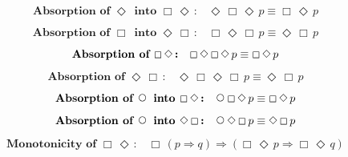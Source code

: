 \documentclass[12pt, fleqn, leqno]{article}
\newcommand{\impl}{\ensuremath{\Rightarrow}}        %
\newcommand{\Next}{\;\,\text{\raisebox{3.5pt}{\circle{6}}}}
\newcommand{\Event}{\Diamond\,}
\newcommand{\Always}{\Box\,}
\newcommand{\spacer}{\vspace{-30pt}}
\begin{document}
\spacer

\begin{equation}\label{E:absEvent}
\textbf{Absorption of $\Event$ into $\Always\Event$:}\quad \Event\Always\Event p \equiv \Always\Event p
\end{equation}

\spacer

\begin{equation}\label{E:absAlways}
\textbf{Absorption of $\Always$ into $\Event\Always$:}\quad \Always\Event\Always p \equiv \Event\Always p
\end{equation}

\spacer

\begin{equation}\label{E:absAlwaysEvent}
\textbf{Absorption of $ \Always\Event$:}\quad \Always \Event\Always\Event p \equiv \Always\Event p
\end{equation}

\spacer

\begin{equation}\label{E:absEventAlways}
\textbf{Absorption of $\Event \Always$:}\quad \Event \Always \Event\Always p \equiv \Event\Always p
\end{equation}

\spacer

\begin{equation}\label{E:absNextAlwaysEvent}
\textbf{Absorption of $\Next$ into $\Always\Event$:}\quad \Next\Always\Event p \equiv \Always\Event p
\end{equation}

\spacer

\begin{equation}\label{E:absNextEventAlways}
\textbf{Absorption of $\Next$ into $\Event\Always$:}\quad \Next\Event\Always p \equiv \Event\Always p
\end{equation}

\spacer

\begin{equation}\label{E:monoAlwaysEvent}
\textbf{Monotonicity of $\Always\Event$:}\quad \Always (p \impl q) \impl (\Always\Event p \impl \Always\Event q)
\end{equation}
\end{document}
